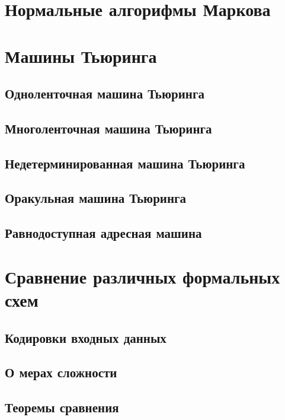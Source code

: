 \section{Нормальные алгорифмы Маркова}
\clearpage

\section{Машины Тьюринга}
\clearpage

\subsection{Одноленточная машина Тьюринга}
\clearpage

\subsection{Многоленточная машина Тьюринга}
\clearpage

\subsection{Недетерминированная машина Тьюринга}
\clearpage

\subsection{Оракульная машина Тьюринга}
\clearpage

\subsection{Равнодоступная адресная машина}
\clearpage

\section{Сравнение различных формальных схем}
\clearpage

\subsection{Кодировки входных данных}
\clearpage

\subsection{О мерах сложности}
\clearpage

\subsection{Теоремы сравнения}
\clearpage

